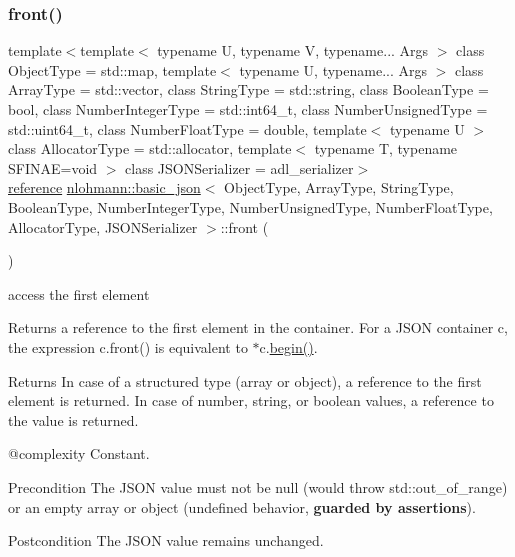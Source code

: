 \subsubsection{\texorpdfstring{front()}{front()}\hspace{0.1cm}{\footnotesize\ttfamily [1/2]}}
{\footnotesize\ttfamily template$<$template$<$ typename U, typename V, typename... Args $>$ class Object\+Type = std\+::map, template$<$ typename U, typename... Args $>$ class Array\+Type = std\+::vector, class String\+Type  = std\+::string, class Boolean\+Type  = bool, class Number\+Integer\+Type  = std\+::int64\+\_\+t, class Number\+Unsigned\+Type  = std\+::uint64\+\_\+t, class Number\+Float\+Type  = double, template$<$ typename U $>$ class Allocator\+Type = std\+::allocator, template$<$ typename T, typename S\+F\+I\+N\+A\+E=void $>$ class J\+S\+O\+N\+Serializer = adl\+\_\+serializer$>$ \\
\mbox{\hyperlink{classnlohmann_1_1basic__json_ac6a5eddd156c776ac75ff54cfe54a5bc}{reference}} \mbox{\hyperlink{classnlohmann_1_1basic__json}{nlohmann\+::basic\+\_\+json}}$<$ Object\+Type, Array\+Type, String\+Type, Boolean\+Type, Number\+Integer\+Type, Number\+Unsigned\+Type, Number\+Float\+Type, Allocator\+Type, J\+S\+O\+N\+Serializer $>$\+::front (\begin{DoxyParamCaption}{ }\end{DoxyParamCaption})\hspace{0.3cm}{\ttfamily [inline]}}



access the first element 

Returns a reference to the first element in the container. For a J\+S\+ON container {\ttfamily c}, the expression {\ttfamily c.\+front()} is equivalent to {\ttfamily $\ast$c.\mbox{\hyperlink{classnlohmann_1_1basic__json_a0ff28dac23f2bdecee9564d07f51dcdc}{begin()}}}.

\begin{DoxyReturn}{Returns}
In case of a structured type (array or object), a reference to the first element is returned. In case of number, string, or boolean values, a reference to the value is returned.
\end{DoxyReturn}
@complexity Constant.

\begin{DoxyPrecond}{Precondition}
The J\+S\+ON value must not be {\ttfamily null} (would throw {\ttfamily std\+::out\+\_\+of\+\_\+range}) or an empty array or object (undefined behavior, {\bfseries{guarded by assertions}}). 
\end{DoxyPrecond}
\begin{DoxyPostcond}{Postcondition}
The J\+S\+ON value remains unchanged.
\end{DoxyPostcond}

